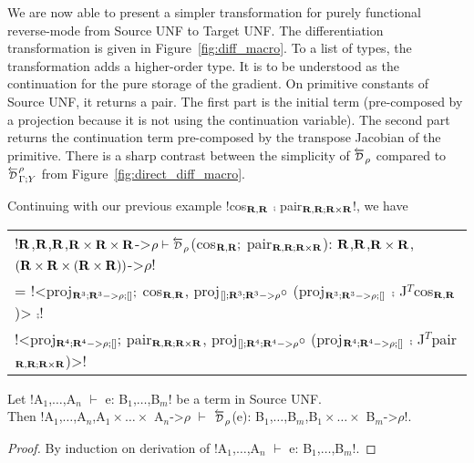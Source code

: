 We are now able to present a simpler transformation for purely functional reverse-mode from Source UNF to Target UNF.
The differentiation transformation is given in Figure~\ref{fig:diff_macro}.
To a list of types, the transformation adds a higher-order type. 
It is to be understood as the continuation for the pure storage of the gradient.
On primitive constants of Source UNF, it returns a pair. 
The first part is the initial term (pre-composed by a projection because it is not using the continuation variable).
The second part returns the continuation term pre-composed by the transpose Jacobian of the primitive. 
There is a sharp contrast between the simplicity of $\Dsynrevsymbol_{\rho}$ compared to $\directD{\rho}{\Gamma}{Y}$ from Figure~\ref{fig:direct_diff_macro}.

\begin{example}
    Continuing with our previous example !cos$_{\mathbf{R},\mathbf{R}}$ $\comp$ pair$_{\mathbf{R},\mathbf{R}; \mathbf{R}\times\mathbf{R}}$!, we have

    \begin{tabular}{l}
        !$\mathbf{R}$,$\mathbf{R}$,$\mathbf{R}$,$\mathbf{R}\times\mathbf{R}\times\mathbf{R}$->$\rho \vdash \Dsynrevsymbol_{\rho}$(cos$_{\mathbf{R},\mathbf{R}};$ pair$_{\mathbf{R},\mathbf{R}; \mathbf{R}\times\mathbf{R}}$): $\mathbf{R}$,$\mathbf{R}$,$\mathbf{R} \times \mathbf{R}$,$(\mathbf{R}\times\mathbf{R}\times(\mathbf{R}\times\mathbf{R}))$->$\rho$! \\
        = !<proj$_{\mathbf{R}^3;\mathbf{R}^3->\rho;[]} ;$ cos$_{\mathbf{R},\mathbf{R}}$, proj$_{[];\mathbf{R}^3;\mathbf{R}^3->\rho} \circ$ (proj$_{\mathbf{R}^3;\mathbf{R}^3->\rho;[]}$ $\comp$ J$^T$cos$_{\mathbf{R},\mathbf{R}}$)> $\comp$! \\
        !<proj$_{\mathbf{R}^4;\mathbf{R}^4->\rho;[]} ;$ pair$_{\mathbf{R},\mathbf{R}; \mathbf{R}\times\mathbf{R}}$, proj$_{[];\mathbf{R}^4;\mathbf{R}^4->\rho} \circ$ (proj$_{\mathbf{R}^4;\mathbf{R}^4->\rho;[]}$ $\comp$ J$^T$pair$_{\mathbf{R},\mathbf{R}; \mathbf{R}\times\mathbf{R}}$)>!
    \end{tabular}
\end{example}

\begin{lemma}
    Let !A$_{1}$,$\ldots$,A$_{n}$ $\vdash$ e: B$_{1}$,$\ldots$,B$_{m}$! be a term in Source UNF. \\
    Then  !A$_{1}$,$\ldots$,A$_{n}$,A$_{1}\times\ldots\times$ A$_{n}$->$\rho$ $\vdash$ $\Dsynrevsymbol_{\rho}$(e): B$_{1}$,$\ldots$,B$_{m}$,B$_{1}\times\ldots\times$ B$_{m}$->$\rho$!.
\end{lemma}
\begin{proof}
    By induction on derivation of !A$_{1}$,$\ldots$,A$_{n}$ $\vdash$ e: B$_{1}$,$\ldots$,B$_{m}$!.
\end{proof}

